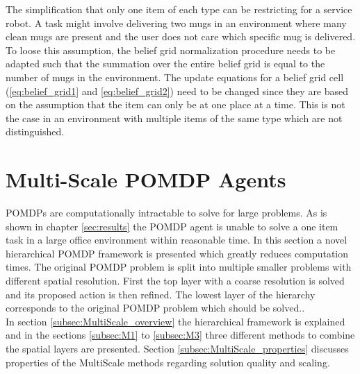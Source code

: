 The simplification that only one item of each type can be restricting for a service robot. A task might involve delivering two mugs in an environment where many clean mugs are present and the user does not care which specific mug is delivered. To loose this assumption, the belief grid normalization procedure needs to be adapted such that the summation over the entire belief grid is equal to the number of mugs in the environment. The update equations for a belief grid cell (\ref{eq:belief_grid1} and \ref{eq:belief_grid2}) need to be changed since they are based on the assumption that the item can only be at one place at a time. This is not the case in an environment with multiple items of the same type which are not distinguished. 
 
\section{Multi-Scale POMDP Agents}\label{sec:MultiScale}
POMDPs are computationally intractable to solve for large problems. As is shown in chapter \ref{sec:results} the POMDP agent is unable to solve a one item task in a large office environment within reasonable time. In this section a novel hierarchical POMDP framework is presented which greatly reduces computation times. The original POMDP problem is split into multiple smaller problems with different spatial resolution. First the top layer with a coarse resolution is solved and its proposed action is then refined. The lowest layer of the hierarchy corresponds to the original POMDP problem which should be solved..\\
In section \ref{subsec:MultiScale_overview} the hierarchical framework is explained and in the sections \ref{subsec:M1} to \ref{subsec:M3} three different methods to combine the spatial layers are presented. Section \ref{subsec:MultiScale_properties} discusses properties of the MultiScale methods regarding solution quality and scaling. 

